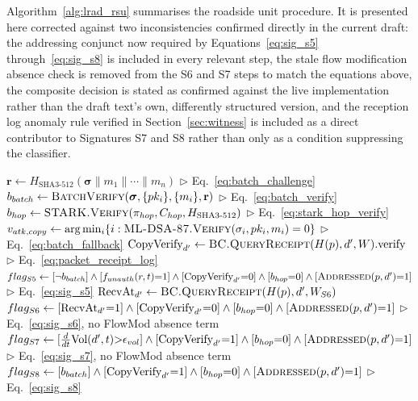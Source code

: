 \documentclass[final,5p,twocolumn]{elsarticle}
\renewcommand{\Comment}[1]{\hfill$\triangleright$ #1}
\theoremstyle{remark}
\theoremstyle{plain}
\begin{document}
Algorithm~\ref{alg:lrad_rsu} summarises the roadside unit procedure. It is
presented here corrected against two inconsistencies confirmed directly in
the current draft: the addressing conjunct now required by
Equations~\eqref{eq:sig_s5} through~\eqref{eq:sig_s8} is included in every
relevant step, the stale flow modification absence check is removed from
the S6 and S7 steps to match the equations above, the composite decision is
stated as confirmed against the live implementation rather than the draft
text's own, differently structured version, and the reception log anomaly
rule verified in Section~\ref{sec:witness} is included as a direct
contributor to Signatures S7 and S8 rather than only as a condition
suppressing the classifier.
\begin{algorithm}[!t]
	\caption{Lightweight and Full Rule Based Attack Detection at the Roadside Unit (LRAD RSU), Hidden Forwarding Steps}
	\label{alg:lrad_rsu}
	\begin{algorithmic}[1]
		\small
		\State $\mathbf{r} \gets H_{\text{SHA3-512}}(\boldsymbol{\sigma}\|m_1\|\cdots\|m_n)$ \Comment{Eq.~\eqref{eq:batch_challenge}}
		\State $b_{batch} \gets \textsc{BatchVerify}(\boldsymbol{\sigma}, \{pk_i\}, \{m_i\}, \mathbf{r})$ \Comment{Eq.~\eqref{eq:batch_verify}}
		\State $b_{hop} \gets \textsc{STARK.Verify}(\pi_{hop}, C_{hop}, H_{\text{SHA3-512}})$ \Comment{Eq.~\eqref{eq:stark_hop_verify}}
		\State $v_{atk,copy} \gets \arg\min_{i}\{i : \textsc{ML-DSA-87.Verify}(\sigma_i,pk_i,m_i)=0\}$ \Comment{Eq.~\eqref{eq:batch_fallback}}
		\EndIf
		\State $\text{CopyVerify}_{d'} \gets \textsc{BC.QueryReceipt}(H(p),d',W).\text{verify}$ \Comment{Eq.~\eqref{eq:packet_receipt_log}}
		\State $flag_{S5} \gets [\neg b_{batch}] \land [f_{unauth}(r,t){=}1] \land [\text{CopyVerify}_{d'}{=}0] \land [b_{hop}{=}0] \land [\textsc{Addressed}(p,d'){=}1]$ \Comment{Eq.~\eqref{eq:sig_s5}}
		\State $\text{RecvAt}_{d'} \gets \textsc{BC.QueryReceipt}(H(p),d',W_{S6})$
		\State $flag_{S6} \gets [\text{RecvAt}_{d'}{=}1] \land [\text{CopyVerify}_{d'}{=}0] \land [b_{hop}{=}0] \land [\textsc{Addressed}(p,d'){=}1]$ \Comment{Eq.~\eqref{eq:sig_s6}, no FlowMod absence term}
		\State $flag_{S7} \gets [\tfrac{d}{dt}\text{Vol}(d',t){>}\epsilon_{vol}] \land [\text{CopyVerify}_{d'}{=}1] \land [b_{hop}{=}0] \land [\textsc{Addressed}(p,d'){=}1]$ \Comment{Eq.~\eqref{eq:sig_s7}, no FlowMod absence term}
		\State $flag_{S8} \gets [b_{batch}] \land [\text{CopyVerify}_{d'}{=}1] \land [b_{hop}{=}0] \land [\textsc{Addressed}(p,d'){=}1]$ \Comment{Eq.~\eqref{eq:sig_s8}}

\end{algorithmic}
\end{algorithm}
\end{document}
